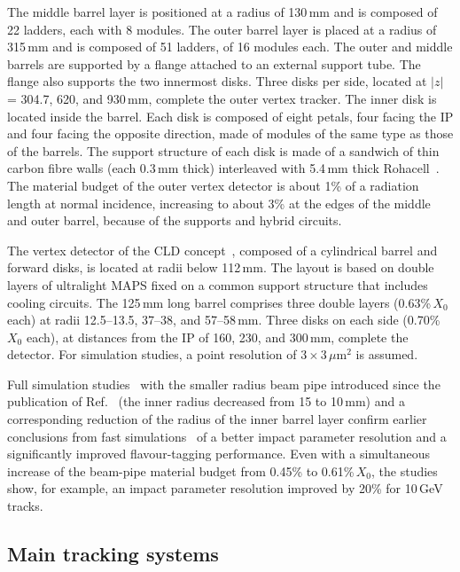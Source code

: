 The middle barrel layer is positioned at a radius of 130\,mm and is composed of 22 ladders, each with 8 modules.
The outer barrel layer is placed at a radius of 315\,mm and is composed of 51 ladders, of 16 modules each.
The outer and middle barrels are supported by a flange attached to an external support tube. 
The flange also supports the two innermost disks.
%
Three disks per side, located at $|z|$ = 304.7, 620, and 930\,mm, complete the outer vertex tracker. 
The inner disk is located inside the barrel.
Each disk is composed of eight petals, 
four facing the IP and four facing the opposite direction,
made of modules of the same type as those of the barrels.
The support structure of each disk is made of a sandwich of thin carbon fibre walls (each 0.3\,mm thick) 
interleaved with 5.4\,mm thick Rohacell~\cite{Rohacell}. 
The material budget of the outer vertex detector is about 1\% of a radiation length at normal incidence, 
increasing to about 3\% at the edges of the middle and outer barrel, because of the supports and hybrid circuits.

The vertex detector of the CLD concept~\cite{Bacchetta:2019fmz}, composed of a cylindrical barrel and forward disks, 
is located at radii below 112\,mm. 
The layout is based on double layers of ultralight MAPS fixed on a common support structure that includes cooling circuits. 
The 125\,mm long barrel comprises three double layers (0.63\%\,$X_0$ each) at radii 12.5--13.5, 37--38, and 57--58\,mm. 
Three disks on each side (0.70\%\,$X_0$ each), at distances from the IP of 160, 230, and 300\,mm, complete the detector. 
For simulation studies, a point resolution of $3 \times 3$\,$\mu$m$^2$ is assumed.

Full simulation studies~\cite{Sadowski:2024} with the smaller radius beam pipe 
introduced since the publication of Ref.~\cite{Bacchetta:2019fmz} 
(the inner radius decreased from 15 to 10\,mm)
and a corresponding reduction of the radius of the inner barrel layer 
confirm earlier conclusions from fast simulations~\cite{Bacchetta:2019fmz} 
of a better impact parameter resolution and a significantly improved flavour-tagging performance. 
Even with a simultaneous increase of the beam-pipe material budget from 0.45\% to 0.61\%\,$X_0$, 
the studies show, for example, an impact parameter resolution improved by 20\% for 10\,GeV tracks.

\subsection{Main tracking systems}
\label{sec:Detectors_MainTracking}

